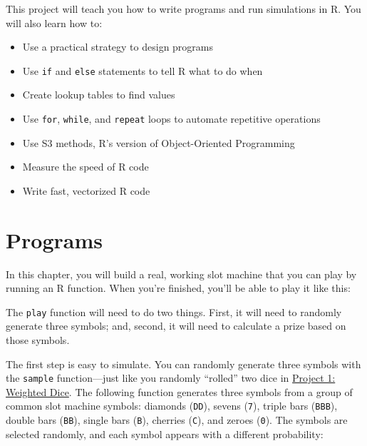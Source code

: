 \documentclass[
  letterpaper,
  DIV=11,
  numbers=noendperiod]{scrbook}
\newenvironment{Shaded}{\begin{snugshade}}{\end{snugshade}}
\newcommand{\DocumentationTok}[1]{\textcolor[rgb]{0.37,0.37,0.37}{\textit{#1}}}
\newcommand{\FunctionTok}[1]{\textcolor[rgb]{0.28,0.35,0.67}{#1}}
\newcommand{\NormalTok}[1]{\textcolor[rgb]{0.00,0.23,0.31}{#1}}
\providecommand{\tightlist}{%
  \setlength{\itemsep}{0pt}\setlength{\parskip}{0pt}}
\begin{document}
This project will teach you how to write programs and run simulations in
R. You will also learn how to:

\begin{itemize}
\tightlist
\item
  Use a practical strategy to design programs
\item
  Use \texttt{if} and \texttt{else} statements to tell R what to do when
\item
  Create lookup tables to find values
\item
  Use \texttt{for}, \texttt{while}, and \texttt{repeat} loops to
  automate repetitive operations
\item
  Use S3 methods, R's version of Object-Oriented Programming
\item
  Measure the speed of R code
\item
  Write fast, vectorized R code
\end{itemize}

\chapter{Programs}\label{sec-programs}

In this chapter, you will build a real, working slot machine that you
can play by running an R function. When you're finished, you'll be able
to play it like this:

\begin{Shaded}
\end{Shaded}

The \texttt{play} function will need to do two things. First, it will
need to randomly generate three symbols; and, second, it will need to
calculate a prize based on those symbols.

The first step is easy to simulate. You can randomly generate three
symbols with the \texttt{sample} function---just like you randomly
``rolled'' two dice in \hyperref[sec-project-dice]{Project 1: Weighted
Dice}. The following function generates three symbols from a group of
common slot machine symbols: diamonds (\texttt{DD}), sevens
(\texttt{7}), triple bars (\texttt{BBB}), double bars (\texttt{BB}),
single bars (\texttt{B}), cherries (\texttt{C}), and zeroes
(\texttt{0}). The symbols are selected randomly, and each symbol appears
with a different probability:
\end{document}
